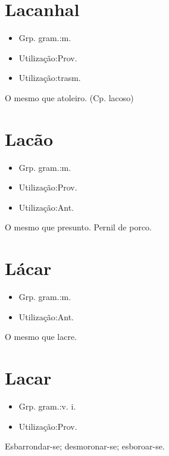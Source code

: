 \section{Lacanhal}
\begin{itemize}
\item {Grp. gram.:m.}
\end{itemize}
\begin{itemize}
\item {Utilização:Prov.}
\end{itemize}
\begin{itemize}
\item {Utilização:trasm.}
\end{itemize}
O mesmo que \textunderscore atoleiro\textunderscore .
(Cp. \textunderscore lacoso\textunderscore )
\section{Lacão}
\begin{itemize}
\item {Grp. gram.:m.}
\end{itemize}
\begin{itemize}
\item {Utilização:Prov.}
\end{itemize}
\begin{itemize}
\item {Utilização:Ant.}
\end{itemize}
O mesmo que \textunderscore presunto\textunderscore .
Pernil de porco.
\section{Lácar}
\begin{itemize}
\item {Grp. gram.:m.}
\end{itemize}
\begin{itemize}
\item {Utilização:Ant.}
\end{itemize}
O mesmo que \textunderscore lacre\textunderscore .
\section{Lacar}
\begin{itemize}
\item {Grp. gram.:v. i.}
\end{itemize}
\begin{itemize}
\item {Utilização:Prov.}
\end{itemize}
Esbarrondar-se; desmoronar-se; esboroar-se.
